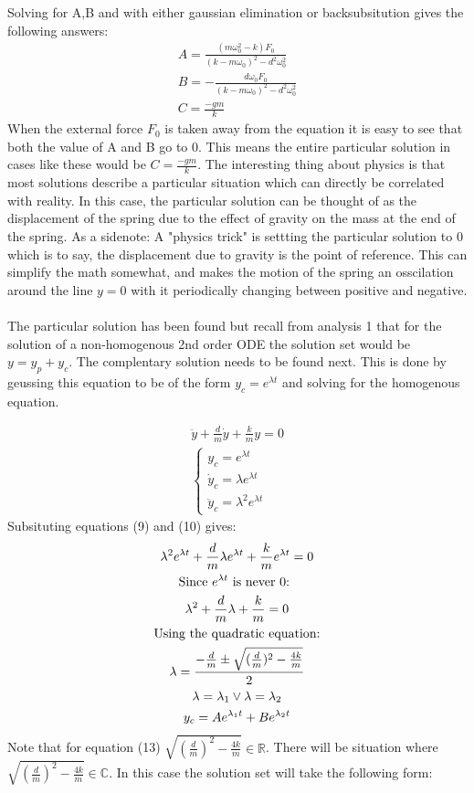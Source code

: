 \documentclass[11pt, a4paper]{article}
\begin{document}
Solving for A,B and with either gaussian elimination or backsubsitution gives the following answers:
\begin{gather}
  A = \frac{(m\omega_0^2-k)F_0}{(k-m\omega_0)^2-d^2\omega_0^2}\\
  B = -\frac{d\omega_0F_0}{(k-m\omega_0)^2-d^2\omega_0^2}\\
  C = \frac{-gm}{k}
\end{gather}
When the external force $F_0$ is taken away from the equation it is easy to see
that both the value of A and B go to $0$. This means the entire particular solution
in cases like these would be $C = \frac{-gm}{k}$. The interesting thing about physics is that
most solutions describe a particular situation which can directly be correlated with reality.
In this case, the particular solution can be thought of as the displacement of the spring
due to the effect of gravity on the mass at the end of the spring. As a sidenote:
A "physics trick" is settting the particular solution to $0$ which is to say, the displacement
due to gravity is the point of reference. This can simplify the math somewhat, and makes the motion
of the spring an osscilation around the line $y=0$ with it periodically changing
between positive and negative.\\
\\
The particular solution has been found but recall from analysis 1 that for the solution
of a non-homogenous 2nd order ODE the solution set would be $y = y_p + y_c$.
The complentary solution needs to be found next. This is done by geussing this equation to be
of the form $y_c = e^{\lambda t}$ and solving for the homogenous equation.

\begin{gather}
  \ddot{y} + \frac{d}{m}\dot{y} + \frac{k}{m}y = 0\\
  \begin{cases}
    y_c = e^{\lambda t}\\
    \dot{y}_c = \lambda e^{\lambda t}\\
    \ddot{y}_c = \lambda^2 e^{\lambda t}
  \end{cases}
\end{gather}
Subsituting equations (9) and (10) gives:
\begin{gather}
  \lambda^2 e^{\lambda t} + \frac{d}{m}\lambda e^{\lambda t} + \frac{k}{m}e^{\lambda t} = 0\\
  \text{Since $e^{\lambda t}$ is never 0: }\notag \\
  \lambda^2 + \frac{d}{m}\lambda + \frac{k}{m} = 0\\
  \text{Using the quadratic equation:}\notag \\
  \lambda = \frac{-\frac{d}{m} \pm \sqrt{(\frac{d}{m})^2 - \frac{4k}{m}}}{2}\\
  \lambda = \lambda_1 \vee \lambda = \lambda_2\\
  y_c = Ae^{\lambda_1t} + Be^{\lambda_2t}
\end{gather}
Note that for equation (13) $\sqrt{(\frac{d}{m})^2-\frac{4k}{m}} \in \mathbb{R}$. There will be situation where
$\sqrt{(\frac{d}{m})^2-\frac{4k}{m}} \in \mathbb{C}$. In this case the solution set will take the following form:
\end{document}
